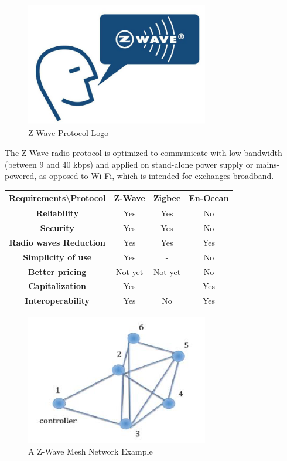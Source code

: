 \begin{figure}[htbp]
	\centering
		\includegraphics[width=8cm]{Figures/zwavelogo.jpg}
	\caption[Z-Wave Protocol Logo]{Z-Wave Protocol Logo}
	\label{fig:zwavelogo}
\end{figure}

The Z-Wave radio protocol is optimized to communicate with low bandwidth (between 9 and 40 kbps) and applied on stand-alone power supply or mains-powered, as opposed to Wi-Fi, which is intended for exchanges broadband.

\begin{center}
  \begin{tabular}{@{} cccc @{}}
    \toprule
    Requirements\textbackslash Protocol & \textbf{Z-Wave} & \textbf{Zigbee} & \textbf{En-Ocean} \\*
    \midrule
    \textbf{Reliability} & Yes & Yes & No \\
    \textbf{Security} & Yes & Yes & No \\
    \textbf{Radio waves Reduction} & Yes & Yes & Yes \\
    \textbf{Simplicity of use} & Yes & - & No \\
    \textbf{Better pricing} & Not yet & Not yet & No \\
    \textbf{Capitalization} & Yes & - & Yes \\
    \textbf{Interoperability} & Yes & No & Yes \\
    \bottomrule
  \end{tabular}
\end{center}
\begin{figure}[htbp]
	\centering
		\includegraphics[width=8cm]{Figures/zwavenetwork.png}
	\caption[A Z-Wave Mesh Network Example]{A Z-Wave Mesh Network Example}
	\label{fig:zwavenetwork}
\end{figure}

